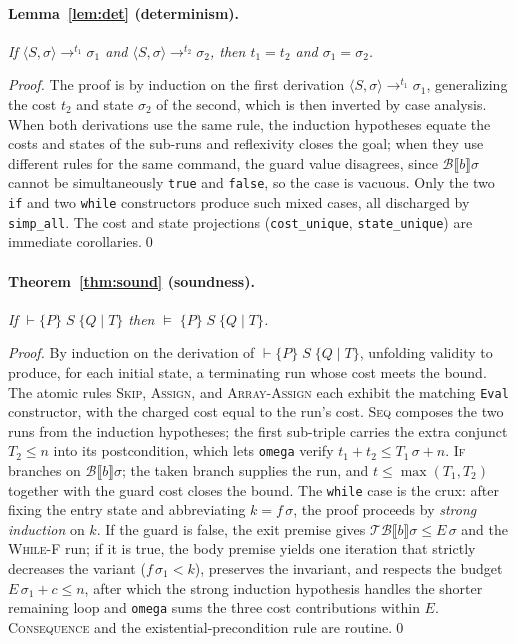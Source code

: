\documentclass[runningheads]{llncs}
\newcommand{\State}{\sigma}
\newcommand{\bval}[1]{\mathcal{B}\llbracket #1 \rrbracket}
\newcommand{\tbcost}[1]{\mathcal{T\!B}\llbracket #1 \rrbracket}
\newcommand{\evals}[4]{\langle #1, #2\rangle \rightarrow^{#3} #4}
\newcommand{\triple}[4]{\{#1\}\;#2\;\{#3 \mid #4\}}
\newcommand{\Valid}{\vDash}
\newcommand{\code}[1]{\texttt{#1}}
\begin{document}
\paragraph{Lemma~\ref{lem:det} (determinism).}
\emph{If $\evals{S}{\State}{t_1}{\State_1}$ and
$\evals{S}{\State}{t_2}{\State_2}$, then $t_1 = t_2$ and
$\State_1 = \State_2$.}

\begin{proof}
The proof is by induction on the first derivation $\evals{S}{\State}{t_1}{\State_1}$,
generalizing the cost $t_2$ and state $\State_2$ of the second, which is then
inverted by case analysis. When both derivations use the same rule, the induction
hypotheses equate the costs and states of the sub-runs and reflexivity closes the
goal; when they use different rules for the same command, the guard value
disagrees, since $\bval{b}\State$ cannot be simultaneously \code{true} and
\code{false}, so the case is vacuous. Only the two \code{if} and two \code{while}
constructors produce such mixed cases, all discharged by \code{simp\_all}. The cost
and state projections (\code{cost\_unique}, \code{state\_unique}) are immediate
corollaries.\qed
\end{proof}

\paragraph{Theorem~\ref{thm:sound} (soundness).}
\emph{If $\vdash \triple{P}{S}{Q}{T}$ then $\Valid\;\triple{P}{S}{Q}{T}$.}

\begin{proof}
By induction on the derivation of $\vdash \triple{P}{S}{Q}{T}$, unfolding validity
to produce, for each initial state, a terminating run whose cost meets the bound.
The atomic rules \textsc{Skip}, \textsc{Assign}, and \textsc{Array-Assign} each
exhibit the matching \code{Eval} constructor, with the charged cost equal to the
run's cost. \textsc{Seq} composes the two runs from the induction hypotheses; the
first sub-triple carries the extra conjunct $T_2 \le n$ into its postcondition,
which lets \code{omega} verify $t_1 + t_2 \le T_1\,\State + n$. \textsc{If}
branches on $\bval{b}\State$; the taken branch supplies the run, and
$t \le \max(T_1,T_2)$ together with the guard cost closes the bound. The
\code{while} case is the crux: after fixing the entry state and abbreviating
$k = f\,\State$, the proof proceeds by \emph{strong induction} on $k$. If the guard
is false, the exit premise gives $\tbcost{b}\State \le E\,\State$ and the
\textsc{While-F} run; if it is true, the body premise yields one iteration that
strictly decreases the variant ($f\,\State_1 < k$), preserves the invariant, and
respects the budget $E\,\State_1 + c \le n$, after which the strong induction
hypothesis handles the shorter remaining loop and \code{omega} sums the three cost
contributions within $E$. \textsc{Consequence} and the existential-precondition
rule are routine.\qed
\end{proof}
\end{document}
